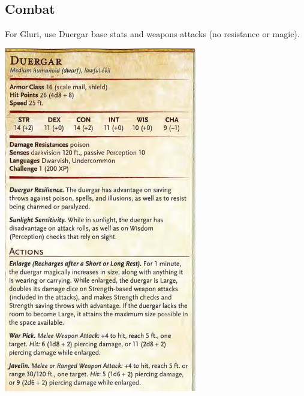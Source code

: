 \pagebreak
\subsection{Combat}
For Gluri, use Duergar base stats and weapons attacks (no resistance or magic).
\begin{multicols}{2}

\includegraphics[width=\linewidth,keepaspectration=true]{img/statblock/duergar-clipped.png}


\end{multicols}
